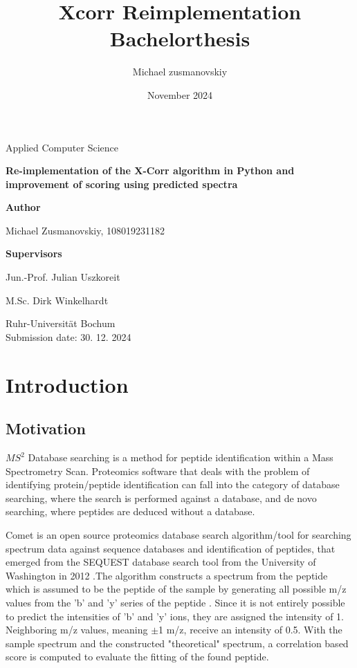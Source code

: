 \documentclass{article}
\title{Xcorr Reimplementation Bachelorthesis}
\author{Michael zusmanovskiy}
\date{November 2024}
\begin{document}
\begin{titlepage}
    \begin{center}
        \LARGE
        Applied Computer Science

        \vspace{1.5cm}
            
        \LARGE
        \textbf{Re-implementation of the X-Corr algorithm in Python and improvement of scoring using predicted spectra}
            
        \vspace{1.5cm}

        \LARGE
        \textbf{Author}
        
        Michael Zusmanovskiy, 108019231182
        
        \vspace{1.5cm}
        
        \LARGE
        \textbf{Supervisors}
        
        Jun.-Prof. Julian Uszkoreit
        
        M.Sc. Dirk Winkelhardt
            
        \vfill
            

        \vspace{0.8cm}

        \Large
        Ruhr-Universität Bochum\\
        
        Submission date: 30. 12. 2024
            
    \end{center}
\end{titlepage}


\section{Introduction}
\subsection{Motivation}
\(MS^2\) Database searching is a method for peptide identification within a Mass Spectrometry Scan. Proteomics software
that deals with the problem of identifying protein/peptide identification can fall into the category of database searching,
where the search is performed against a database, and de novo searching, where peptides are deduced without a database.

Comet is an open source proteomics database search algorithm/tool for searching spectrum data against sequence databases and identification of peptides, that emerged from the SEQUEST database search tool from the University of Washington in 2012 \cite{comet-search-tool}.The algorithm 
constructs a spectrum from the peptide which is assumed to be the peptide
of the sample by generating all possible m/z values from the 'b' and 'y' series of the peptide \cite{comet-first-paper}.  Since it is not entirely possible to predict the intensities of 'b' and 'y' ions, they are assigned the intensity of 1. Neighboring m/z values, meaning $\pm$1 m/z, receive an intensity of 0.5. With the sample spectrum and the constructed "theoretical" spectrum, a correlation based score is computed
to evaluate the fitting of the found peptide.
\end{document}
